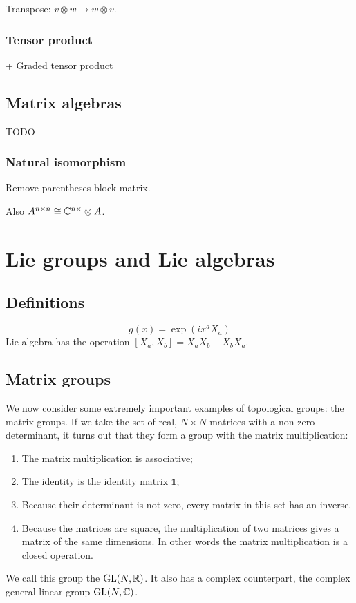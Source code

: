 Transpose: $v\otimes w \to w\otimes v$.

\subsection{Tensor product}
+ Graded tensor product

\section{Matrix algebras}
\begin{definition}
TODO
\end{definition}

\subsection{Natural isomorphism}
Remove parentheses block matrix.

Also $A^{n\times n} \cong \mathbb{C}^{n\times }\otimes A$.

\chapter{Lie groups and Lie algebras}
\section{Definitions}
\[ g(x) = \exp(ix^aX_a) \]
Lie algebra has the operation $[X_a,X_b]= X_aX_b - X_bX_a$. 
\section{Matrix groups}
We now consider some extremely important examples of topological groups: the matrix groups.
If we take the set of real, $N\times N$ matrices with a non-zero determinant, it turns out that they form a group with the matrix multiplication:
\begin{enumerate}
\item The matrix multiplication is associative;
\item The identity is the identity matrix $\mathbb{1}$;
\item Because their determinant is not zero, every matrix in this set has an inverse.
\item Because the matrices are square, the multiplication of two matrices gives a matrix of the same dimensions. In other words the matrix multiplication is a closed operation.
\end{enumerate}
We call this group the  $\operatorname{GL}(N, \mathbb{R})$. It also has a complex counterpart, the complex general linear group $\operatorname{GL}(N, \mathbb{C})$.

